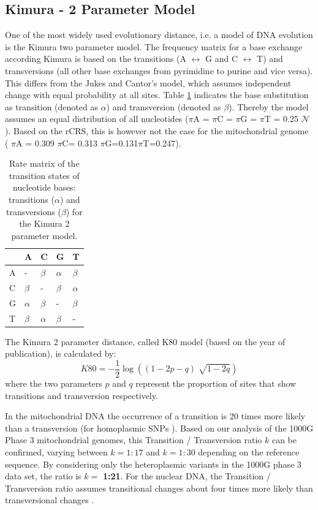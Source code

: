 \subsection{Kimura - 2 Parameter Model}
One of the most widely used evolutionary distance, i.e. a model of DNA evolution is the Kimura two parameter model. The frequency matrix for a base exchange according Kimura \cite{Kimura1980} is based on the transitions (A $\leftrightarrow$ G and C $\leftrightarrow$ T) and transversions (all other base exchanges from pyrimidine to purine and vice versa). This differs from the Jukes and Cantor's model, which assumes independent change with equal probability at all sites.
Table \ref{hg:kimuratable} indicates the base substitution as transition (denoted as $\alpha$) and transversion (denoted as $\beta$). Thereby the model assumes an equal distribution of all nucleotides ($\pi$A = $\pi$C = $\pi$G = $\pi$T = 0.25 $\mathcal{N}$). Based on the rCRS, this is however not the case for the mitochondrial genome ( $\pi$A = 0.309 $\pi$C= 0.313 $\pi$G=0.131$\pi$T=0.247).
\begin{table}[h]

\centering
\caption{Rate matrix of the transition states of nucleotide bases: transitions ($\alpha$) and transversions ($\beta$) for the Kimura 2 parameter model.}
\label{hg:kimuratable}
\begin{tabular}{lllll}
\hline
   & A&  C   &G  & T\\
\hline

A  & - & $\beta$    & $\alpha$  & $\beta$ \\
C  & $\beta$ &  -   & $\beta$  & $\alpha$ \\
G  & $\alpha$ &  $\beta$    & - & $\beta$ \\
T  & $\beta$ &  $\alpha$    & $\beta$  & - \\
\end{tabular}
\end{table}

The Kimura 2 parameter distance, called K80 model (based on the year of publication), is calculated by:
\begin{equation}
K80 = - \frac{1}{2} \log((1- 2p -q ) \sqrt[]{1-2q})
\end{equation}
where the two parameters $p$ and $q$ represent the proportion of sites that show transitions and transversion respectively.

In the mitochondrial DNA the occurrence of a transition is 20 times more likely than a transversion (for homoplasmic SNPs \cite{Guo2012}). Based on our analysis of the 1000G Phase 3 mitochondrial genomes, this Transition / Transversion ratio $k$ can be confirmed, varying between $k=1:17$ and $k=1:30$ depending on the reference sequence. By considering only the heteroplasmic variants in the 1000G phase 3 data set, the ratio is $k=$ \textbf{1:21}. For the nuclear DNA, the Transition / Transversion ratio assumes transitional changes about four times more likely than transversional changes \cite{salemi2009the}. 


